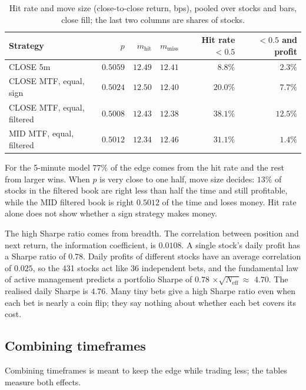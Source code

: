 \documentclass[11pt,a4paper]{article}
\begin{document}
\begin{table}[htbp]
\centering
\caption{Hit rate and move size (close-to-close return, bps), pooled over stocks and bars, close fill;
the last two columns are shares of stocks.}
\label{tab:hit}
\small
\begin{tabular}{@{}lrrrrr@{}}
\toprule
Strategy & $p$ & $m_{\text{hit}}$ & $m_{\text{miss}}$ & Hit rate $<0.5$ & $<0.5$ and profit \\
\midrule
CLOSE 5m & $0.5059$ & $12.49$ & $12.41$ & $8.8\%$ & $2.3\%$ \\
CLOSE MTF, equal, sign & $0.5024$ & $12.50$ & $12.40$ & $20.0\%$ & $7.7\%$ \\
CLOSE MTF, equal, filtered & $0.5008$ & $12.43$ & $12.38$ & $38.1\%$ & $12.5\%$ \\
MID MTF, equal, filtered & $0.5012$ & $12.34$ & $12.46$ & $31.1\%$ & $1.4\%$ \\
\bottomrule
\end{tabular}
\end{table}

For the 5-minute model $77\%$ of the edge comes from the hit rate and the rest from larger wins.
When $p$ is very close to one half, move size decides: $13\%$ of stocks in the filtered book
are right less than half the time and still profitable, while the MID filtered book is right
$0.5012$ of the time and loses money. Hit rate alone does not show whether a sign strategy makes
money.

The high Sharpe ratio comes from breadth. The correlation between position and next return, the
information coefficient, is $0.0108$. A single stock's daily profit has a Sharpe ratio of $0.78$.
Daily profits of different stocks have an average correlation of $0.025$, so the 431 stocks act like
$36$ independent bets, and the fundamental law of active management \citep{grinold1989} predicts
a portfolio Sharpe of $0.78$ $\times\sqrt{N_{\text{eff}}}\approx$ $4.70$. The realised daily
Sharpe is $4.76$. Many tiny bets give a high Sharpe ratio even when each bet is nearly a coin flip; they
say nothing about whether each bet covers its cost.

\subsection{Combining timeframes}
\label{sec:mtf}

Combining timeframes is meant to keep the edge while trading less; the tables measure both effects.
\end{document}
